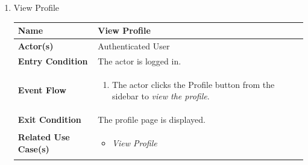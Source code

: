 \begin{enumerate}
\item View Profile
\begin{center}
    \begin{tabular}{ | m{10em} | m{10cm}| } 
      \hline
      \textbf{Name} & View Profile  \\ 
      \hline
      \textbf{Actor(s)} & Authenticated User \\ 
      \hline
      \textbf{Entry Condition} & The actor is logged in. \\ 
      \hline
      \textbf{Event Flow} & 
          \begin{enumerate}[(1)]
              \item The actor clicks the Profile button from the sidebar to \textit{view the profile}.
          \end{enumerate}
      \\ 
      \hline
      \textbf{Exit Condition} & The profile page is displayed.  \\ 
      \hline
      \textbf{Related Use Case(s)} & 
      \begin{itemize}
          \item \textit{View Profile}
      \end{itemize}
          \\ 
      \hline
    \end{tabular}
\end{center}


\newpage


\end{enumerate}
